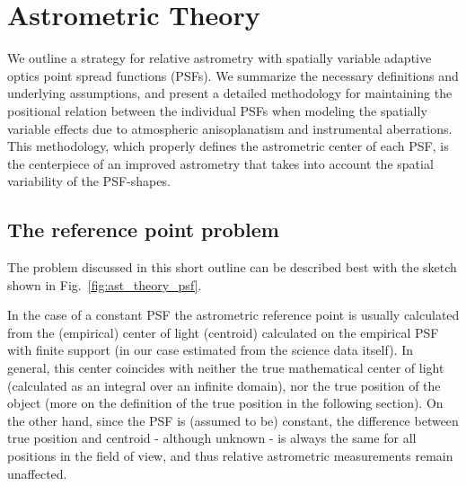 \section{Astrometric Theory}
\label{sec:astrometric_theory}

  
We outline a strategy for relative astrometry with spatially variable adaptive optics point spread functions (PSFs). We summarize the necessary definitions and underlying assumptions, and present a detailed methodology for maintaining the positional relation between the individual PSFs when modeling the spatially variable effects due to atmospheric anisoplanatism and instrumental aberrations. This methodology, which properly defines the astrometric center of each PSF, is the centerpiece of an improved astrometry that takes into account the spatial variability of the PSF-shapes.

\subsection{The reference point problem}

The problem discussed in this short outline can be described best with the sketch shown in Fig.~\ref{fig:ast_theory_psf}. 

In the case of a constant PSF the astrometric reference point is usually calculated from the (empirical) center of light (centroid) calculated on the empirical PSF with finite support (in our case estimated from the science data itself). In general, this center coincides with neither the true mathematical center of light (calculated as an integral over an infinite domain), nor the true position of the object (more on the definition of the true position in the following section). On the other hand, since the PSF is (assumed to be) constant, the difference between true position and centroid - although unknown - is always the same for all positions in the field of view, and thus relative astrometric measurements remain unaffected.

